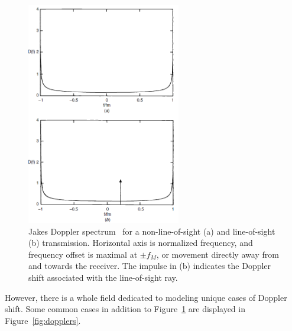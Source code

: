 \FloatBarrier 
\begin{figure}[ht!]
	\centering	\includegraphics[width=0.6\textwidth,keepaspectratio]{figs/jakes.png}
    \caption{Jakes Doppler spectrum~\cite{pahlavan2005wireless} for a non-line-of-sight (a) and line-of-sight (b) transmission. Horizontal axis is normalized frequency, and frequency offset is maximal at $\pm f_M$, or movement directly away from and towards the receiver. The impulse in (b) indicates the Doppler shift associated with the line-of-sight ray.} 
\label{fig:jakes}      
\end{figure}
\FloatBarrier
However, there is a whole field dedicated to modeling unique cases of Doppler shift. Some common cases in addition to Figure~\ref{fig:jakes} are displayed in Figure~\ref{fig:dopplers}.

